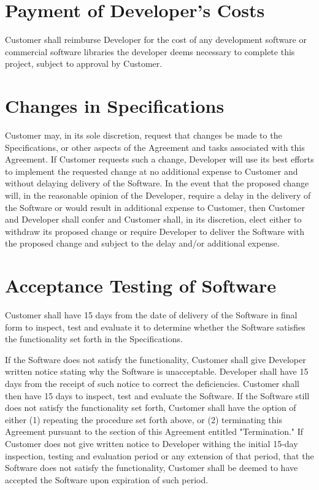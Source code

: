 \documentclass[11pt]{article}
\begin{document}
\section{Payment of Developer’s Costs}
Customer shall reimburse Developer for the cost of any development software or commercial software libraries the developer deems necessary to complete this project, subject to approval by Customer.
\section{Changes in Specifications}
Customer may, in its sole discretion, request that changes be made to the Specifications, or other aspects of the Agreement and tasks associated with this Agreement. If Customer requests such a change, Developer will use its best efforts to implement the requested change at no additional expense to Customer and without delaying delivery of the Software. In the event that the proposed change will, in the reasonable opinion of the Developer, require a delay in the delivery of the Software or would result in additional expense to Customer, then Customer and Developer shall confer and Customer shall, in its discretion, elect either to withdraw its proposed change or require Developer to deliver the Software with the proposed change and subject to the delay and/or additional expense.
\section{Acceptance Testing of Software}
Customer shall have 15 days from the date of delivery of the Software in final form to inspect, test and evaluate it to determine whether the Software satisfies the functionality set forth in the Specifications.

If the Software does not satisfy the functionality, Customer shall give Developer written notice stating why the Software is unacceptable. Developer shall have 15 days from the receipt of such notice to correct the deficiencies. Customer shall then have 15 days to inspect, test and evaluate the Software. If the Software still does not satisfy the functionality set forth, Customer shall have the option of either (1) repeating the procedure set forth above, or (2) terminating this Agreement pursuant to the section of this Agreement entitled "Termination." If Customer does not give written notice to Developer withing the initial 15-day inspection, testing and evaluation period or any extension of that period, that the Software does not satisfy the functionality, Customer shall be deemed to have accepted the Software upon expiration of such period.
\end{document}
